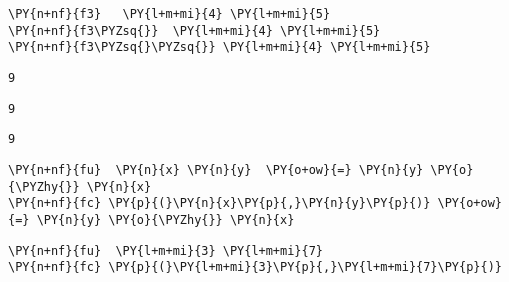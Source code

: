     \begin{tcolorbox}[breakable, size=fbox, boxrule=1pt, pad at break*=1mm,colback=cellbackground, colframe=cellborder, top=.75ex]
\begin{Verbatim}[commandchars=\\\{\}]
\PY{n+nf}{f3}   \PY{l+m+mi}{4} \PY{l+m+mi}{5}
\PY{n+nf}{f3\PYZsq{}}  \PY{l+m+mi}{4} \PY{l+m+mi}{5}
\PY{n+nf}{f3\PYZsq{}\PYZsq{}} \PY{l+m+mi}{4} \PY{l+m+mi}{5}
\end{Verbatim}
\end{tcolorbox}

    
    \begin{Verbatim}[commandchars=\\\{\}]
9
    \end{Verbatim}

    
    
    \begin{Verbatim}[commandchars=\\\{\}]
9
    \end{Verbatim}

    
    
    \begin{Verbatim}[commandchars=\\\{\}]
9
    \end{Verbatim}

    
    \begin{tcolorbox}[breakable, size=fbox, boxrule=1pt, pad at break*=1mm,colback=cellbackground, colframe=cellborder, top=.75ex]
\begin{Verbatim}[commandchars=\\\{\}]
\PY{n+nf}{fu}  \PY{n}{x} \PY{n}{y}  \PY{o+ow}{=} \PY{n}{y} \PY{o}{\PYZhy{}} \PY{n}{x}
\PY{n+nf}{fc} \PY{p}{(}\PY{n}{x}\PY{p}{,}\PY{n}{y}\PY{p}{)} \PY{o+ow}{=} \PY{n}{y} \PY{o}{\PYZhy{}} \PY{n}{x}
\end{Verbatim}
\end{tcolorbox}

    \begin{tcolorbox}[breakable, size=fbox, boxrule=1pt, pad at break*=1mm,colback=cellbackground, colframe=cellborder, top=.75ex]
\begin{Verbatim}[commandchars=\\\{\}]
\PY{n+nf}{fu}  \PY{l+m+mi}{3} \PY{l+m+mi}{7}
\PY{n+nf}{fc} \PY{p}{(}\PY{l+m+mi}{3}\PY{p}{,}\PY{l+m+mi}{7}\PY{p}{)}
\end{Verbatim}
\end{tcolorbox}

